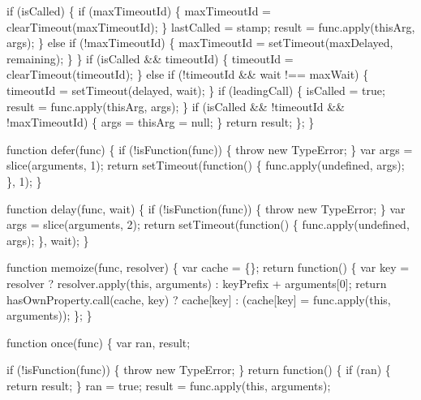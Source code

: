 \begin{DoxyCodeInclude}
{{        \textcolor{keywordflow}{if} (isCalled) \{
          \textcolor{keywordflow}{if} (maxTimeoutId) \{
            maxTimeoutId = clearTimeout(maxTimeoutId);
          \}
          lastCalled = stamp;
          result = func.apply(thisArg, args);
        \}
        \textcolor{keywordflow}{else} \textcolor{keywordflow}{if} (!maxTimeoutId) \{
          maxTimeoutId = setTimeout(maxDelayed, remaining);
        \}
      \}
      \textcolor{keywordflow}{if} (isCalled && timeoutId) \{
        timeoutId = clearTimeout(timeoutId);
      \}
      \textcolor{keywordflow}{else} \textcolor{keywordflow}{if} (!timeoutId && wait !== maxWait) \{
        timeoutId = setTimeout(delayed, wait);
      \}
      \textcolor{keywordflow}{if} (leadingCall) \{
        isCalled = \textcolor{keyword}{true};
        result = func.apply(thisArg, args);
      \}
      \textcolor{keywordflow}{if} (isCalled && !timeoutId && !maxTimeoutId) \{
        args = thisArg = null;
      \}
      \textcolor{keywordflow}{return} result;
    \};
  \}

  \textcolor{keyword}{function} defer(func) \{
    \textcolor{keywordflow}{if} (!isFunction(func)) \{
      \textcolor{keywordflow}{throw} \textcolor{keyword}{new} TypeError;
    \}
    var args = slice(arguments, 1);
    \textcolor{keywordflow}{return} setTimeout(\textcolor{keyword}{function}() \{ func.apply(undefined, args); \}, 1);
  \}

  \textcolor{keyword}{function} delay(func, wait) \{
    \textcolor{keywordflow}{if} (!isFunction(func)) \{
      \textcolor{keywordflow}{throw} \textcolor{keyword}{new} TypeError;
    \}
    var args = slice(arguments, 2);
    \textcolor{keywordflow}{return} setTimeout(\textcolor{keyword}{function}() \{ func.apply(undefined, args); \}, wait);
  \}

  \textcolor{keyword}{function} memoize(func, resolver) \{
    var cache = \{\};
    \textcolor{keywordflow}{return} \textcolor{keyword}{function}() \{
      var key = resolver ? resolver.apply(\textcolor{keyword}{this}, arguments) : keyPrefix + arguments[0];
      \textcolor{keywordflow}{return} hasOwnProperty.call(cache, key)
        ? cache[key]
        : (cache[key] = func.apply(\textcolor{keyword}{this}, arguments));
    \};
  \}

  \textcolor{keyword}{function} once(func) \{
    var ran,
        result;

    \textcolor{keywordflow}{if} (!isFunction(func)) \{
      \textcolor{keywordflow}{throw} \textcolor{keyword}{new} TypeError;
    \}
    \textcolor{keywordflow}{return} \textcolor{keyword}{function}() \{
      \textcolor{keywordflow}{if} (ran) \{
        \textcolor{keywordflow}{return} result;
      \}
      ran = \textcolor{keyword}{true};
      result = func.apply(\textcolor{keyword}{this}, arguments);

}}
\end{DoxyCodeInclude}
